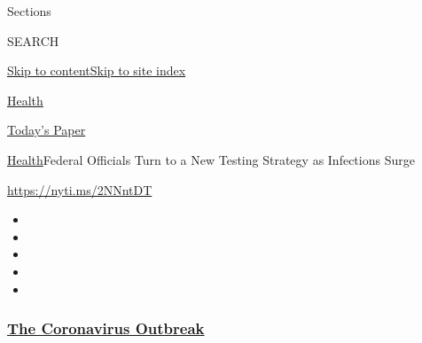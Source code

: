 Sections

SEARCH

\protect\hyperlink{site-content}{Skip to
content}\protect\hyperlink{site-index}{Skip to site index}

\href{https://www.nytimes3xbfgragh.onion/section/health}{Health}

\href{https://myaccount.nytimes3xbfgragh.onion/auth/login?response_type=cookie\&client_id=vi}{}

\href{https://www.nytimes3xbfgragh.onion/section/todayspaper}{Today's
Paper}

\href{/section/health}{Health}\textbar{}Federal Officials Turn to a New
Testing Strategy as Infections Surge

\url{https://nyti.ms/2NNntDT}

\begin{itemize}
\item
\item
\item
\item
\item
\end{itemize}

\hypertarget{the-coronavirus-outbreak}{%
\subsubsection{\texorpdfstring{\href{https://www.nytimes3xbfgragh.onion/news-event/coronavirus?name=styln-coronavirus-national\&region=TOP_BANNER\&block=storyline_menu_recirc\&action=click\&pgtype=Article\&impression_id=2e58a6e0-f1c3-11ea-8a7f-39e977841eba\&variant=undefined}{The
Coronavirus
Outbreak}}{The Coronavirus Outbreak}}\label{the-coronavirus-outbreak}}

